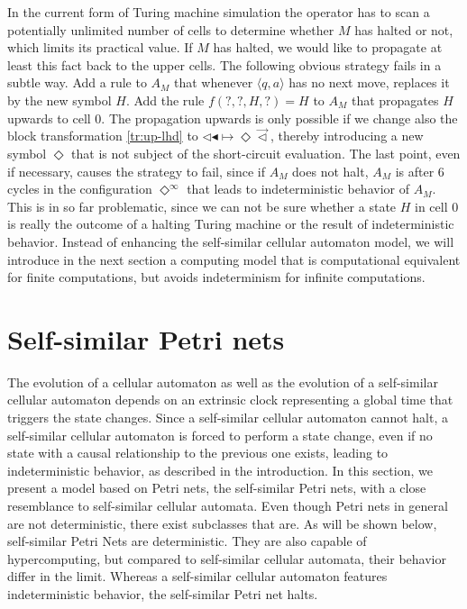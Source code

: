 \documentclass[pre,showpacs,showkeys,preprint]{revtex4}
\theoremstyle{definition}
\begin{document}
In the current form of Turing machine simulation the operator has to scan a potentially unlimited number of cells to determine whether
$M$ has halted or not, which limits its practical value.
If $M$ has halted, we would like to propagate at least this fact back to the upper cells.
The following obvious strategy fails in a subtle way.
Add a rule to $A_M$ that whenever $\langle q, a \rangle$ has no next move, replaces it by the new symbol $H$.
Add the rule $f(?, ?, H, ?) = H$ to $A_M$
that propagates $H$ upwards to cell $0$.
The propagation upwards is only possible if we change also the block transformation \ref{tr:up-lhd}  to
$\lhd  \blacktriangleleft \mapsto \Diamond  \overrightarrow{\lhd}$,
thereby introducing a new symbol $\Diamond$ that is not subject
of the short-circuit evaluation.
The last point, even if necessary, causes the strategy to fail, since if $A_M$ does not halt,
$A_M$ is after 6 cycles in the configuration $\Diamond^\infty$ that
leads to indeterministic behavior of $A_M$.
This is in so far problematic, since we can not be sure whether a state $H$ in cell $0$
is really the outcome of a halting Turing machine or the result of indeterministic behavior.
Instead of enhancing the self-similar cellular automaton model, we will introduce in the next section a computing model
that is computational equivalent for finite computations, but avoids indeterminism for infinite
computations.

\section{Self-similar Petri nets}
\label{chap:petri}

The evolution of a cellular automaton as well as the evolution of a self-similar cellular automaton depends on an extrinsic clock representing a global time that
triggers the state changes.
Since a self-similar cellular automaton cannot halt, a self-similar cellular automaton is forced to perform a state change, even if no state
with a causal relationship to the previous one exists, leading to indeterministic behavior,
as described in the introduction.
In this section, we present a model based on Petri nets, the self-similar Petri nets, with a close resemblance to self-similar cellular automata.
Even though Petri nets in general are not deterministic, there exist subclasses that are.
As  will be shown below, self-similar Petri Nets are deterministic.
They are also capable of hypercomputing, but compared to self-similar cellular automata, their behavior differ in the limit.
Whereas a self-similar cellular automaton features indeterministic behavior, the self-similar Petri net halts.
\end{document}
